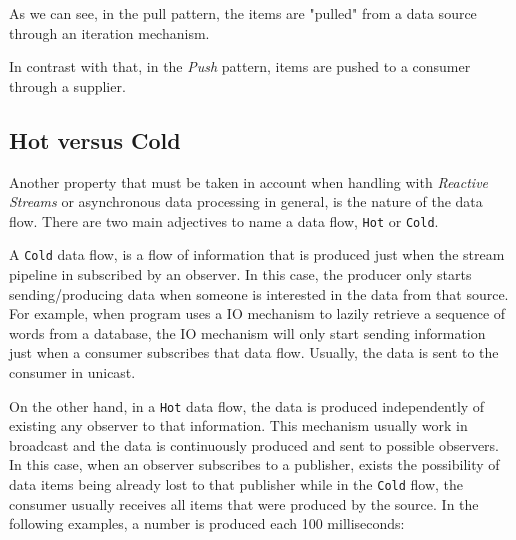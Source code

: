	As we can see, in the pull pattern, the items are "pulled" from a data source through an iteration mechanism. 
	
	In contrast with that, in the \textit{Push} pattern, items are pushed to a consumer through a supplier.


	\subsection{Hot versus Cold}
	
	Another property that must be taken in account when handling with \textit{Reactive Streams} or asynchronous data processing in general, is the nature of the data flow. 
	There are two main adjectives to name a data flow, \texttt{Hot} or \texttt{Cold}. 

	A \texttt{Cold} data flow, is a flow of information that is produced just when the stream pipeline in subscribed by an observer. In this case, the producer only starts sending/producing data when someone is interested in the data from that source. 
	For example, when program uses a IO mechanism to lazily retrieve a sequence of words from a database, the IO mechanism will only start sending information just when a consumer subscribes that data flow. Usually, the data is sent to the consumer in unicast.
	
	On the other hand, in a \texttt{Hot} data flow, the data is produced independently of existing any observer to that information. This mechanism usually work in broadcast and the data is continuously produced and sent to possible observers.
	In this case, when an observer subscribes to a publisher, exists the possibility of data items being already lost to that publisher while in the \texttt{Cold} flow, the consumer usually receives all items that were produced by the source.
	In the following examples, a number is produced each 100 milliseconds:


